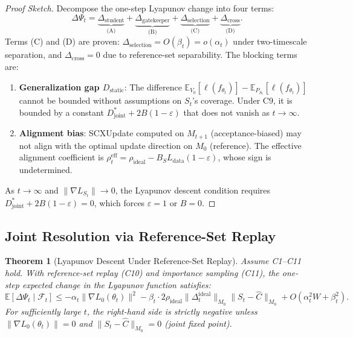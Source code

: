 \documentclass[11pt,a4paper]{article}
\theoremstyle{plain}
\newtheorem{theorem}{Theorem}[section]
\theoremstyle{definition}
\theoremstyle{remark}
\newcommand{\E}{\mathbb{E}}
\newcommand{\F}{\mathcal{F}}
\begin{document}
\begin{proof}[Proof Sketch]
    Decompose the one-step Lyapunov change into four terms:
    \begin{equation}
        \Delta\Psi_t = \underbrace{\Delta_{\text{student}}}_{\text{(A)}} + \underbrace{\Delta_{\text{gatekeeper}}}_{\text{(B)}} + \underbrace{\Delta_{\text{selection}}}_{\text{(C)}} + \underbrace{\Delta_{\text{cross}}}_{\text{(D)}}.
    \end{equation}
    Terms (C) and (D) are proven: $\Delta_{\text{selection}} = O(\beta_t) = o(\alpha_t)$ under two-timescale separation, and $\Delta_{\text{cross}} = 0$ due to reference-set separability. The blocking terms are:
    \begin{enumerate}[nosep]
        \item \textbf{Generalization gap $D_{\text{static}}$}: The difference $\E_{V_0}[\ell(f_{\theta_t})] - \E_{P_{S_t}}[\ell(f_{\theta_t})]$ cannot be bounded without assumptions on $S_t$'s coverage. Under C9, it is bounded by a constant $D_{\text{joint}}^* + 2B(1-\varepsilon)$ that does not vanish as $t \to \infty$.
        \item \textbf{Alignment bias}: SCXUpdate computed on $M_{t+1}$ (acceptance-biased) may not align with the optimal update direction on $M_0$ (reference). The effective alignment coefficient is $\rho_t^{\text{eff}} = \rho_{\text{ideal}} - B_S L_{\text{data}} (1-\varepsilon)$, whose sign is undetermined.
    \end{enumerate}
    As $t \to \infty$ and $\|\nabla L_{S_t}\| \to 0$, the Lyapunov descent condition requires $D_{\text{joint}}^* + 2B(1-\varepsilon) = 0$, which forces $\varepsilon = 1$ or $B = 0$.
\end{proof}

\subsection{Joint Resolution via Reference-Set Replay}

\begin{theorem}[Lyapunov Descent Under Reference-Set Replay]\label{thm:lyapunov-proven}
    Assume C1--C11 hold. With reference-set replay (C10) and importance sampling (C11), the one-step expected change in the Lyapunov function satisfies:
    \begin{equation}\label{eq:lyapunov-full}
        \E[\Delta\Psi_t \mid \F_t] \leq -\alpha_t \|\nabla L_0(\theta_t)\|^2 - \beta_t \cdot 2\rho_{\text{ideal}} \|\Delta_t^{\text{ideal}}\|_{M_0} \|S_t - \hat{C}\|_{M_0} + O(\alpha_t^2 W + \beta_t^2).
    \end{equation}
    For sufficiently large $t$, the right-hand side is strictly negative unless $\|\nabla L_0(\theta_t)\| = 0$ \emph{and} $\|S_t - \hat{C}\|_{M_0} = 0$ (joint fixed point).
\end{theorem}
\end{document}
